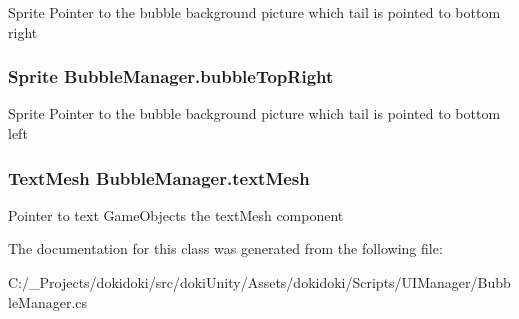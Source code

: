 Sprite Pointer to the bubble background picture which tail is pointed to bottom right 

\subsubsection[{\texorpdfstring{bubble\+Top\+Right}{bubbleTopRight}}]{\setlength{\rightskip}{0pt plus 5cm}Sprite Bubble\+Manager.\+bubble\+Top\+Right}\hypertarget{class_bubble_manager_aa3b8d53f60bbba28edec8924ca5a1ee3}{}\label{class_bubble_manager_aa3b8d53f60bbba28edec8924ca5a1ee3}


Sprite Pointer to the bubble background picture which tail is pointed to bottom left 

\subsubsection[{\texorpdfstring{text\+Mesh}{textMesh}}]{\setlength{\rightskip}{0pt plus 5cm}Text\+Mesh Bubble\+Manager.\+text\+Mesh}\hypertarget{class_bubble_manager_a527b93910188f40019b8a47717e004f7}{}\label{class_bubble_manager_a527b93910188f40019b8a47717e004f7}


Pointer to text Game\+Object\textquotesingle{}s the text\+Mesh component 



The documentation for this class was generated from the following file\+:\begin{DoxyCompactItemize}
\item 
C\+:/\+\_\+\+Projects/dokidoki/src/doki\+Unity/\+Assets/dokidoki/\+Scripts/\+U\+I\+Manager/Bubble\+Manager.\+cs\end{DoxyCompactItemize}
